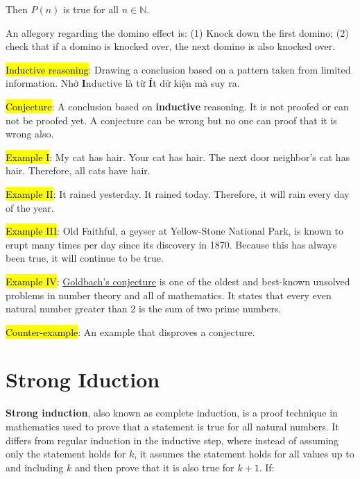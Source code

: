 Then $P(n)$ is true for all $n \in \mathbb{N}$.

\vspace{.3cm}

An allegory regarding the domino effect is: (1) Knock down the first domino; (2) check that if a domino is knocked over, the next domino is also knocked over.

\vspace{0.5cm}

\hl{Inductive reasoning}: Drawing a conclusion based on a pattern taken from limited information. Nhớ \textbf{I}nductive là từ \textbf{Í}t dữ kiện mà suy ra.

\hl{Conjecture}: A conclusion based on \textbf{inductive} reasoning. It is not proofed or can not be proofed yet. A conjecture can be wrong but no one can proof that it is wrong also.

\vspace{.3cm}

\hl{Example I}: My cat has hair. Your cat has hair. The next door neighbor's cat has hair. Therefore, all cats have hair.

\hl{Example II}: It rained yesterday. It rained today. Therefore, it will rain every day of the year.

\hl{Example III}: Old Faithful, a geyser at Yellow-Stone National Park, is known to erupt many times per day since its discovery in 1870. Because this has always been true, it will continue to be true.

\hl{Example IV}: \href{https://en.wikipedia.org/wiki/Goldbach%27s_conjecture}{Goldbach's conjecture} is one of the oldest and best-known unsolved problems in number theory and all of mathematics. It states that every even natural number greater than 2 is the sum of two prime numbers.

\vspace{0.3cm}

\hl{Counter-example}: An example that disproves a conjecture.

\section{Strong Iduction}

\textbf{Strong induction}, also known as complete induction, is a proof technique in mathematics used to prove that a statement is true for all natural numbers. It differs from regular induction in the inductive step, where instead of assuming only the statement holds for \(k\), it assumes the statement holds for all values up to and including $k$ and then prove that it is also true for $k+1$. If:

